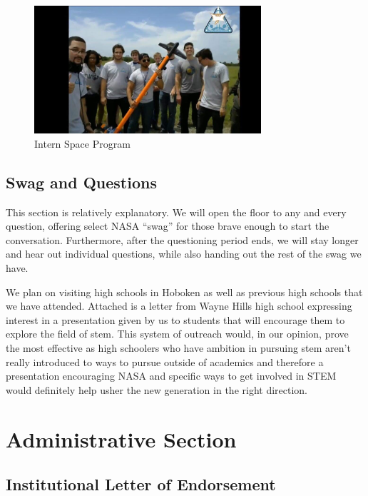 \documentclass{article}
\let\Oldsection\section
\renewcommand{\section}{\FloatBarrier\Oldsection}
\let\Oldsubsection\subsection
\renewcommand{\subsection}{\FloatBarrier\Oldsubsection}
\begin{document}
\begin{figure}[!htb]
  \centering
  \includegraphics[width=0.75\textwidth]{assets/ronnieandplane.png}
  \caption{Intern Space Program}
  \label{fig:ronnieandplane}
\end{figure}

\subsection{Swag and Questions}

This section is relatively explanatory. We will open the floor to any and every question, offering select NASA “swag” for those brave enough to start the conversation. Furthermore, after the questioning period ends, we will stay longer and hear out individual questions, while also handing out the rest of the swag we have. 

We plan on visiting high schools in Hoboken as well as previous high schools that we have attended. Attached is a letter from Wayne Hills high school expressing interest in a presentation given by us to students that will encourage them to explore the field of stem. This system of outreach would, in our opinion, prove the most effective as high schoolers who have ambition in pursuing stem aren’t really introduced to ways to pursue outside of academics and therefore a presentation encouraging NASA and specific ways to get involved in STEM would definitely help usher the new generation in the right direction.

\newpage

\section{Administrative Section}

\subsection{Institutional Letter of Endorsement}
\end{document}
